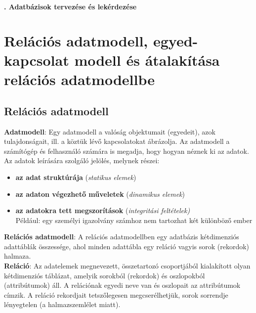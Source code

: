 \documentclass[tikz,12pt,margin=0px]{article}
\begin{document}
    \thispagestyle{fancy}

    \begin{center}
        {\Large\bfseries{}. Adatbázisok tervezése és lekérdezése} \\
    \end{center}
	
	\section*{Relációs adatmodell, egyed-kapcsolat modell és átalakítása relációs adatmodellbe}
	
	\subsection*{Relációs adatmodell\\}
	
    \textbf{Adatmodell}: Egy adatmodell a valóság objektumait (egyedeit), azok tulajdonságait, ill. a köztük lévő kapcsolatokat ábrázolja. Az adatmodell a számítógép és felhasználó számára is megadja, hogy hogyan néznek ki az adatok. Az adatok leírására szolgáló jelölés, melynek részei:

    \begin{itemize}
        \item \textbf{az adat struktúrája} (\emph{statikus elemek})
        \item \textbf{az adaton végezhető műveletek} (\emph{dinamikus elemek})
        \item \textbf{az adatokra tett megszorítások} (\emph{integritási feltételek)}\\
        {\small Például: egy személyi igazolvány számhoz nem tartozhat két különböző ember}
    \end{itemize}

   \noindent \textbf{Relációs adatmodell}: A relációs adatmodellben egy adatbázis kétdimenziós adattáblák összessége, ahol minden adattábla egy reláció vagyis sorok (rekordok) halmaza.\\
	
    \noindent \textbf{Reláció}: Az adatelemek megnevezett, összetartozó csoportjából kialakított olyan kétdimenziós táblázat, amelyik sorokból (rekordok) és oszlopokból (attribútumok) áll. A relációnak egyedi neve van és oszlopait az attribútumok címzik. A reláció rekordjait tetszőlegesen megcserélhetjük, sorok sorrendje lényegtelen (a halmazszemlélet miatt).\\
\end{document}
